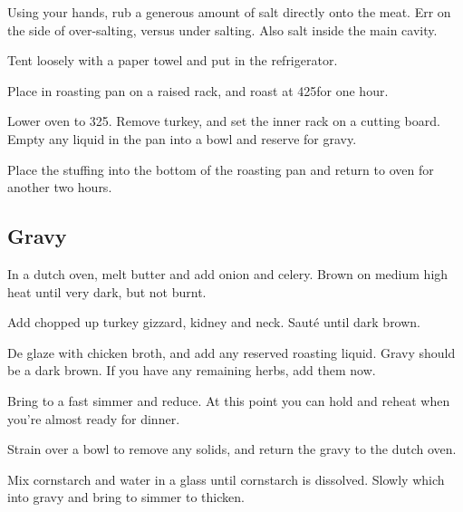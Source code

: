 \begin{recipe}
Using your hands, rub a generous amount of salt directly onto the meat. Err on the side of over-salting, versus under salting. Also salt inside the main cavity.

Tent loosely with a paper towel and put in the refrigerator.

Place in roasting pan on a raised rack, and roast at 425\degree for one hour.

Lower oven to 325\degree. Remove turkey, and set the inner rack on a cutting board. Empty any liquid in the pan into a bowl and reserve for gravy.

Place the stuffing into the bottom of the roasting pan and return to oven for another two hours.

\subsection{Gravy}



In a dutch oven, melt butter and add onion and celery. Brown on medium high heat until very dark, but not burnt.

Add chopped up turkey gizzard, kidney and neck. Sauté until dark brown.


De glaze with chicken broth, and add any reserved roasting liquid. Gravy should be a dark brown. If you have any remaining herbs, add them now.

Bring to a fast simmer and reduce. At this point you can hold and reheat when you're almost ready for dinner.

Strain over a bowl to remove any solids, and return the gravy to the dutch oven.


Mix cornstarch and water in a glass until cornstarch is dissolved. Slowly which into gravy and bring to simmer to thicken.


\end{recipe}
